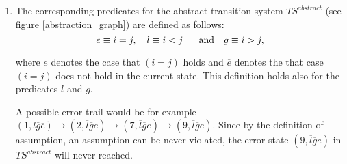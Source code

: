 \begin{enumerate}
\item The corresponding predicates for the abstract transition system $%
TS^{abstract}$ (see figure \ref{abstraction_graph}) are defined as follows:%
\begin{equation*}
e\equiv i=j,\quad l\equiv i<j\quad \text{and\quad }g\equiv i>j,
\end{equation*}

where $e$ denotes the case that $(i=j)$ holds and $\overline{e}$ denotes the
that case $(i=j)$ does not hold in the current state. This definition holds
also for the predicates $l$ and $g$.

A possible error trail would be for example $(1,l\overline{g}\overline{e}%
)\rightarrow (2,\overline{l}\overline{g}e)\rightarrow (7,\overline{l}%
\overline{g}e)\rightarrow (9,\overline{l}\overline{g}e)$. Since by the
definition of assumption, an assumption can be never violated, the
error state $(9,\overline{l}\overline{g}e)$ in $TS^{abstract}$ will never
reached.


\end{enumerate}
